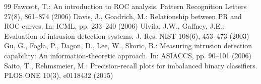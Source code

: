 \documentclass[runningheads]{llncs}
\begin{document}
\begin{thebibliography}{99}
 Fawcett, T.: An introduction to ROC analysis. Pattern Recognition Letters 27(8), 861--874 (2006)
 Davis, J., Goadrich, M.: Relationship between PR and ROC curves. In: ICML, pp. 233--240 (2006)
 Ulvila, J.W., Gaffney, J.E.: Evaluation of intrusion detection systems. J. Res. NIST 108(6), 453--473 (2003)
 Gu, G., Fogla, P., Dagon, D., Lee, W., Skoric, B.: Measuring intrusion detection capability: An information-theoretic approach. In: ASIACCS, pp. 90--101 (2006)
 Saito, T., Rehmsmeier, M.: Precision-recall plots for imbalanced binary classifiers. PLOS ONE 10(3), e0118432 (2015)
\end{thebibliography}
\endgroup
\end{document}
